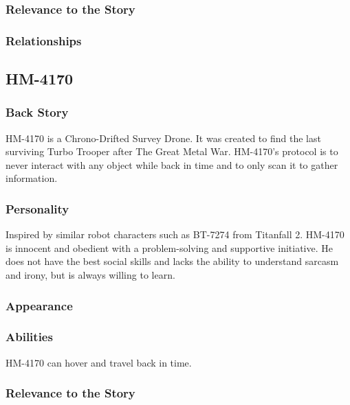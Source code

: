 \documentclass[12pt]{article}
\begin{document}
\subsubsection{Relevance to the Story}

\subsubsection{Relationships}

\subsection{HM-4170}

\subsubsection{Back Story}

HM-4170 is a Chrono-Drifted Survey Drone. It was created to find the last surviving Turbo Trooper after The Great Metal War. HM-4170's protocol is to never interact with any object while back in time and to only scan it to gather information.

\subsubsection{Personality}

Inspired by similar robot characters such as BT-7274 from Titanfall 2. HM-4170 is innocent and obedient with a problem-solving and supportive initiative. He does not have the best social skills and lacks the ability to understand sarcasm and irony, but is always willing to learn.

\subsubsection{Appearance}

\subsubsection{Abilities}

HM-4170 can hover and travel back in time. %

\subsubsection{Relevance to the Story}
\end{document}
